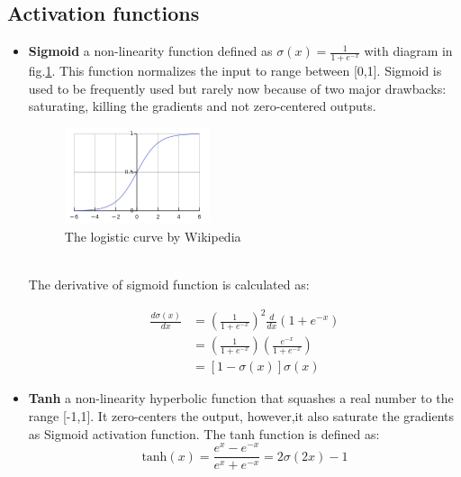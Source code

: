 \subsection{Activation functions}
\begin{itemize}
    \item \textbf{Sigmoid} a non-linearity function defined as $\sigma(x)=\frac{1}{1 + e^{-x}}$ with diagram in fig.\ref{fig:sigmoid}. This function normalizes the input to range between [0,1]. Sigmoid is used to be frequently used but rarely now because of two major drawbacks: saturating, killing the gradients and not zero-centered outputs.\\
    \begin{figure}[h!]
        \centering
        \includegraphics[width=0.4\textwidth]{Chapters/Fig/sigmoid.png}
        \caption{The logistic curve by Wikipedia}
        \label{fig:sigmoid}
    \end{figure}\\
    The derivative of sigmoid function is calculated as:
    \begin{center}
        \begin{equation}
            \begin{split}
                \frac{d\sigma(x)}{dx} & = (\frac{1}{1+e^{-x}})^2\frac{d}{dx}(1+e^{-x})\\
                                    & = (\frac{1}{1+e^{-x}})(\frac{e^{-x}}{1+e^{-x}})\\
                                    & = [1-\sigma(x)]\sigma(x)
            \end{split}
        \end{equation}
    \end{center}
    \pagebreak
    \item \textbf{Tanh} a non-linearity hyperbolic function that squashes a real number to the range [-1,1]. It zero-centers the output, however,it also saturate the gradients as Sigmoid activation function. The tanh function is defined as:
    \begin{equation}
        \text{tanh}(x) = \frac{e^x - e^{-x}}{e^x + e^{-x}} = 2\sigma(2x) - 1
    \end{equation}

\end{itemize}

